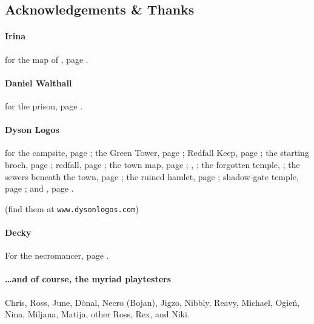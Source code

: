 \begin{multicols}{2}
\columnbreak

\subsection*{Acknowledgements \& Thanks}

\paragraph{Irina}
for the map of , page \pageref{Irina/greylands}.

\paragraph{Daniel Walthall}
for the prison, page \pageref{Daniel_Walthall/prison}.

\paragraph{Dyson Logos}

for the
campsite, page \pageref{Dyson_Logos/forgotten_city};
the Green Tower, page \pageref{Dyson_Logos/green_tower};
Redfall Keep, page \pageref{Dyson_Logos/redfall_keep};
the starting \gls{broch}, page \pageref{Dyson_Logos/broch_map};
\gls{redfall}, page \pageref{Dyson_Logos/redfall};
the town map, page \pageref{Dyson_Logos/town};
, \pageref{Dyson_Logos/mincing_pig};
the forgotten temple, \pageref{Dyson_Logos/qualme_temple};
the sewers beneath the town, page \pageref{Dyson_Logos/sewer};
the ruined hamlet, page \pageref{Dyson_Logos/ruined_village};
shadow-gate temple, page \pageref{Dyson_Logos/shadow_gate};
and
 , page \pageref{Dyson_Logos/lochside}.

(find them at {\tt www.dysonlogos.com})

\paragraph{Decky}

For the necromancer, page \pageref{Decky/necromancer}.

\paragraph{\ldots and of course, the myriad playtesters}
Chris, Ross, June, D\`onal,
Necro (Bojan), Jigzo, Nibbly, Reavy,
Michael, Ogie\'n,
Nina, Miljana, Matija, other Ross, Rex, and
Niki.


\end{multicols}

